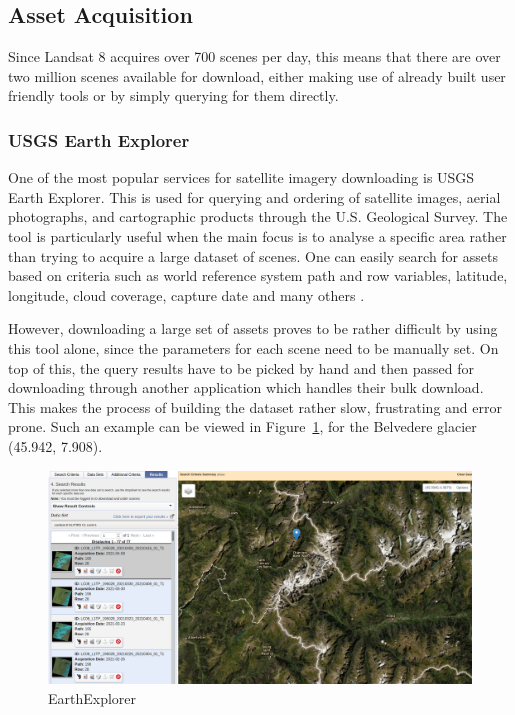 \documentclass[11pt, a4paper]{report}
\begin{document}
	\subsection{Asset Acquisition}	
	
	Since Landsat 8 acquires over 700 scenes per day, this means that there are over two million scenes available for download, either making use of already built user friendly tools or by simply querying for them directly.
	
	\subsubsection{USGS Earth Explorer}
	
	One of the most popular services for satellite imagery downloading is USGS Earth Explorer. This is used for querying and ordering of satellite images, aerial photographs, and cartographic products through the U.S. Geological Survey. The tool is particularly useful when the main focus is to analyse a specific area rather than trying to acquire a large dataset of scenes. One can easily search for assets based on criteria such as world reference system path and row variables, latitude, longitude, cloud coverage, capture date and many others \cite{USGS}.
	
	However, downloading a large set of assets proves to be rather difficult by using this tool alone, since the parameters for each scene need to be manually set. On top of this, the query results have to be picked by hand and then passed for downloading through another application which handles their bulk download. This makes the process of building the dataset rather slow, frustrating and error prone. Such an example can be viewed in Figure~\ref{fig:EarthExplorer}, for the Belvedere glacier (45.942, 7.908).
	
	\begin{figure}[h]
		\centering
		\includegraphics[scale=0.25]{../images/EarthExplorer.png}
		\caption{EarthExplorer}
		\label{fig:EarthExplorer}
	\end{figure}
	
\end{document}
